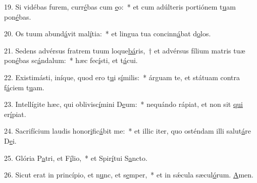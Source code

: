 19. Si vidébas furem, curr\uline{é}bas cum \uline{e}o:~* et cum adúlteris portiónem t\uline{u}am pon\uline{é}bas.\par 
20. Os tuum abund\uline{á}vit mal\uline{í}tia:~* et lingua tua concinn\uline{á}bat d\uline{o}los.\par 
21. Sedens advérsus fratrem tuum loque\uline{bá}ris,~† et advérsus fílium matris tuæ pon\uline{é}bas sc\uline{á}ndalum:~* hæc fec\uline{í}sti, et t\uline{á}cui.\par 
22. Existimásti, iníque, quod ero t\uline{u}i s\uline{í}milis:~* árguam te, et státuam contra f\uline{á}ciem t\uline{u}am.\par 
23. Intellígite hæc, qui oblivisc\uline{í}mini D\uline{e}um:~* nequándo rápiat, et non sit \uline{qui} er\uline{í}piat.\par 
24. Sacrifícium laudis honor\uline{i}fic\uline{á}bit me:~* et illic iter, quo osténdam illi salut\uline{á}re D\uline{e}i.\par 
25. Glória P\uline{a}tri, et F\uline{í}lio,~* et Spir\uline{í}tui S\uline{a}ncto.\par 
26. Sicut erat in princípio, et n\uline{u}nc, et s\uline{e}mper,~* et in sǽcula sæcul\uline{ó}rum. \uline{A}men.\par 
